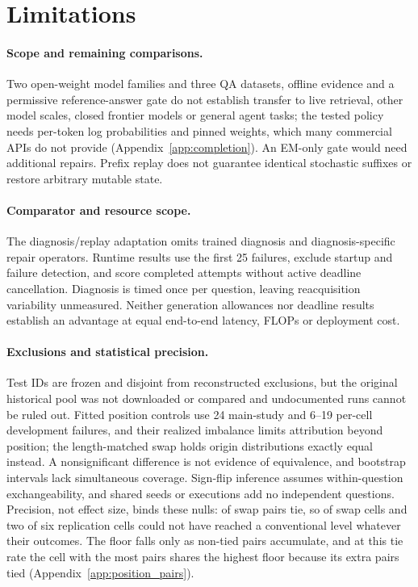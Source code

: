 \documentclass{article}
\begin{document}
\section{Limitations}
\paragraph{Scope and remaining comparisons.}
Two open-weight model families and three QA datasets, offline evidence and a
permissive reference-answer gate do not establish transfer to live retrieval,
other model scales, closed frontier models or general agent tasks; the tested
policy needs per-token log probabilities and pinned weights, which many
commercial APIs do not provide (Appendix~\ref{app:completion}). An EM-only
gate would need additional repairs. Prefix replay does not guarantee
identical stochastic suffixes or restore arbitrary mutable state.

\paragraph{Comparator and resource scope.}
The diagnosis/replay adaptation omits trained diagnosis and diagnosis-specific
repair operators. Runtime results use the first 25 failures, exclude startup
and failure detection, and score completed attempts without active deadline
cancellation. Diagnosis is timed once per question, leaving reacquisition
variability unmeasured. Neither generation allowances nor deadline results
establish an advantage at equal end-to-end latency, FLOPs or deployment cost.

\paragraph{Exclusions and statistical precision.}
Test IDs are frozen and disjoint from reconstructed exclusions, but the
original historical pool was not downloaded or compared and undocumented runs
cannot be ruled out. Fitted position controls use 24 main-study and 6--19
per-cell development failures, and their realized imbalance limits attribution
beyond position; the length-matched swap holds origin distributions exactly
equal instead. A nonsignificant difference is not evidence of equivalence, and
bootstrap intervals lack simultaneous coverage. Sign-flip inference assumes
within-question exchangeability, and shared seeds or executions add no
independent questions. Precision, not effect size, binds these nulls:
\PairTiedPairs{} of \PairPairs{} swap pairs tie, so \PairBlockedCells{} of
\PairTotalCells{} swap cells and two of six replication cells could not have
reached a conventional level whatever their outcomes. The floor falls only as
non-tied pairs accumulate, and at this tie rate the cell with the most pairs
shares the highest floor because its extra pairs tied
(Appendix~\ref{app:position_pairs}).
\end{document}
